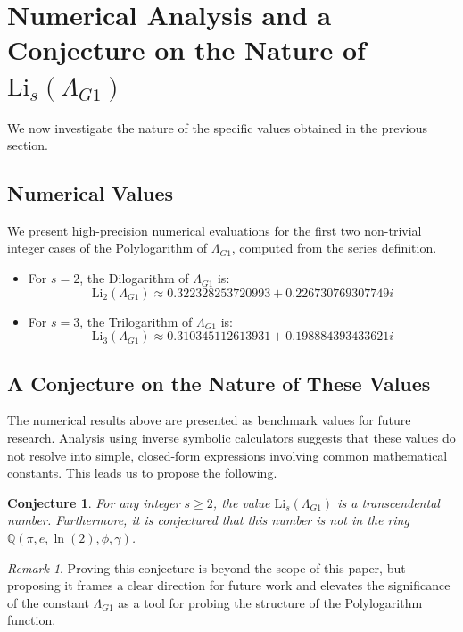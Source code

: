 \documentclass{amsart}
\theoremstyle{plain}
\newtheorem{conjecture}[theorem]{Conjecture}
\theoremstyle{definition}
\theoremstyle{remark}
\newtheorem*{remark}{Remark}
\newcommand{\LambdaG}{\Lambda_{G1}}
\begin{document}
\section{Numerical Analysis and a Conjecture on the Nature of \texorpdfstring{$\mathrm{Li}_s(\LambdaG)$}{Li\_s(Lambda\_G1)}}
We now investigate the nature of the specific values obtained in the previous section.

\subsection{Numerical Values}
We present high-precision numerical evaluations for the first two non-trivial integer cases of the Polylogarithm of $\LambdaG$, computed from the series definition.
\begin{itemize}
    \item For $s=2$, the Dilogarithm of $\LambdaG$ is:
    $$ \mathrm{Li}_2(\LambdaG) \approx 0.322328253720993 + 0.226730769307749i $$
    \item For $s=3$, the Trilogarithm of $\LambdaG$ is:
    $$ \mathrm{Li}_3(\LambdaG) \approx 0.310345112613931 + 0.198884393433621i $$
\end{itemize}

\subsection{A Conjecture on the Nature of These Values}
The numerical results above are presented as benchmark values for future research. Analysis using inverse symbolic calculators suggests that these values do not resolve into simple, closed-form expressions involving common mathematical constants. This leads us to propose the following.

\begin{conjecture}
For any integer $s \ge 2$, the value $\mathrm{Li}_s(\LambdaG)$ is a transcendental number. Furthermore, it is conjectured that this number is not in the ring $\mathbb{Q}(\pi, e, \ln(2), \phi, \gamma)$.
\end{conjecture}
\begin{remark}
Proving this conjecture is beyond the scope of this paper, but proposing it frames a clear direction for future work and elevates the significance of the constant $\LambdaG$ as a tool for probing the structure of the Polylogarithm function.
\end{remark}

\end{document}
